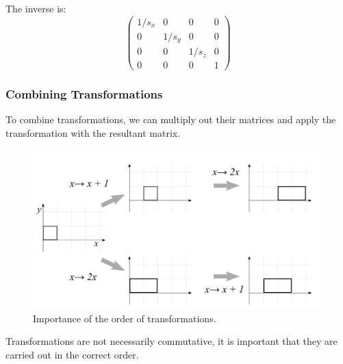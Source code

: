 \documentclass[11pt]{article}
\begin{document}
The inverse is:
\[
  \begin{pmatrix}
    1/s_x & 0 & 0 & 0 \\
    0 & 1/s_y & 0 & 0 \\
    0 & 0 & 1/s_z & 0 \\
    0 & 0 & 0 & 1
  \end{pmatrix}
\]


\subsubsection{Combining Transformations}
To combine transformations, we can multiply out their matrices and apply the transformation with the resultant matrix.

\begin{figure}[htb!]
  \caption{Importance of the order of transformations.}
  \includegraphics[scale=0.2]{combining}
  \centering
\end{figure}

Transformations are not necessarily commutative, it is important that they are carried out in the correct order.
\end{document}
